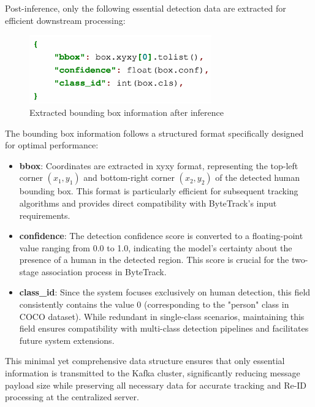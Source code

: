 Post-inference, only the following essential detection data are extracted for efficient downstream processing:

\begin{figure}[htbp]
    \centering
    \includegraphics[width=0.7\textwidth]{Figure/bboxes_yolo.png}
    \caption{Extracted bounding box information after inference}
    \label{fig:bboxes_yolo}
\end{figure}

The bounding box information follows a structured format specifically designed for optimal performance:

\begin{itemize}
    \item \textbf{bbox}: Coordinates are extracted in xyxy format, representing the top-left corner $(x_1, y_1)$ and bottom-right corner $(x_2, y_2)$ of the detected human bounding box. This format is particularly efficient for subsequent tracking algorithms and provides direct compatibility with ByteTrack's input requirements.
    
    \item \textbf{confidence}: The detection confidence score is converted to a floating-point value ranging from 0.0 to 1.0, indicating the model's certainty about the presence of a human in the detected region. This score is crucial for the two-stage association process in ByteTrack.
    
    \item \textbf{class\_id}: Since the system focuses exclusively on human detection, this field consistently contains the value 0 (corresponding to the "person" class in COCO dataset). While redundant in single-class scenarios, maintaining this field ensures compatibility with multi-class detection pipelines and facilitates future system extensions.
\end{itemize}

This minimal yet comprehensive data structure ensures that only essential information is transmitted to the Kafka cluster, significantly reducing message payload size while preserving all necessary data for accurate tracking and Re-ID processing at the centralized server.



